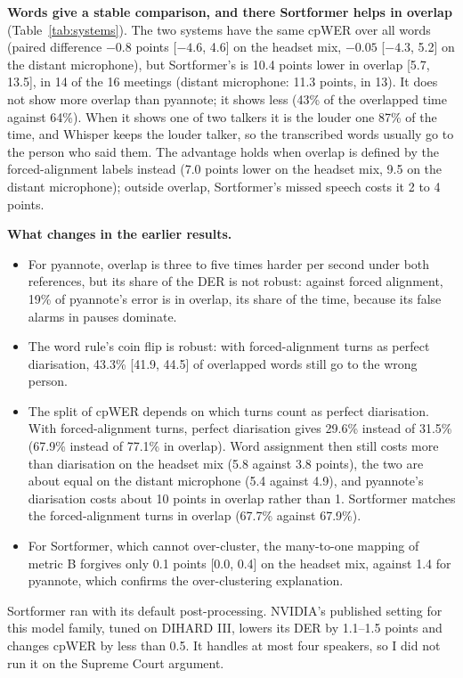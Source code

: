 \documentclass[11pt,a4paper]{article}
\begin{document}
\textbf{Words give a stable comparison, and there Sortformer helps in overlap} (Table~\ref{tab:systems}). The two systems have the same cpWER over all words (paired difference $-0.8$ points [$-4.6$, 4.6] on the headset mix, $-0.05$ [$-4.3$, 5.2] on the distant microphone), but Sortformer's is 10.4 points lower in overlap [5.7, 13.5], in 14 of the 16 meetings (distant microphone: 11.3 points, in 13). It does not show more overlap than pyannote; it shows less (43\% of the overlapped time against 64\%). When it shows one of two talkers it is the louder one 87\% of the time, and Whisper keeps the louder talker, so the transcribed words usually go to the person who said them. The advantage holds when overlap is defined by the forced-alignment labels instead (7.0 points lower on the headset mix, 9.5 on the distant microphone); outside overlap, Sortformer's missed speech costs it 2 to 4 points.

\textbf{What changes in the earlier results.}
\begin{itemize}[leftmargin=*]
  \item For pyannote, overlap is three to five times harder per second under both references, but its share of the DER is not robust: against forced alignment, 19\% of pyannote's error is in overlap, its share of the time, because its false alarms in pauses dominate.
  \item The word rule's coin flip is robust: with forced-alignment turns as perfect diarisation, 43.3\% [41.9, 44.5] of overlapped words still go to the wrong person.
  \item The split of cpWER depends on which turns count as perfect diarisation. With forced-alignment turns, perfect diarisation gives 29.6\% instead of 31.5\% (67.9\% instead of 77.1\% in overlap). Word assignment then still costs more than diarisation on the headset mix (5.8 against 3.8 points), the two are about equal on the distant microphone (5.4 against 4.9), and pyannote's diarisation costs about 10 points in overlap rather than 1. Sortformer matches the forced-alignment turns in overlap (67.7\% against 67.9\%).
  \item For Sortformer, which cannot over-cluster, the many-to-one mapping of metric B forgives only 0.1 points [0.0, 0.4] on the headset mix, against 1.4 for pyannote, which confirms the over-clustering explanation.
\end{itemize}

Sortformer ran with its default post-processing. NVIDIA's published setting for this model family, tuned on DIHARD III, lowers its DER by 1.1--1.5 points and changes cpWER by less than 0.5. It handles at most four speakers, so I did not run it on the Supreme Court argument.
\end{document}
